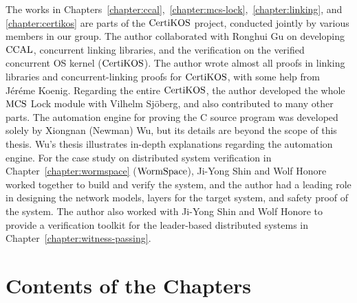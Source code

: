 The works in Chapters~\ref{chapter:ccal},~\ref{chapter:mcs-lock},~\ref{chapter:linking}, and \ref{chapter:certikos}  are parts of the $\mathrm{CertiKOS}$ project,
conducted jointly by various members in our group. 
The author collaborated with Ronghui Gu on developing  $\mathrm{CCAL}$, concurrent linking libraries, and the verification on the verified concurrent OS kernel ($\mathrm{CertiKOS}$). 
The author wrote almost all proofs in linking libraries and concurrent-linking proofs for $\mathrm{CertiKOS}$, with some help from J{\'e}r{\'e}me Koenig. 
Regarding the entire $\mathrm{CertiKOS}$, the author developed the whole $\mathrm{MCS}$ Lock module with Vilhelm Sj{\"o}berg, 
and also contributed to many other parts. 
The automation engine for proving the C source program was developed solely by Xiongnan (Newman) Wu, but its details are beyond the scope of this thesis. 
Wu’s thesis illustrates in-depth explanations regarding the automation engine. 
For the case study on distributed system verification in Chapter~\ref{chapter:wormspace} ($\mathrm{WormSpace}$), Ji-Yong Shin and Wolf Honore worked together to build and verify the system, 
and the author had a leading role in designing the network models, layers for the target system, and safety proof of the system. 
The author also worked with Ji-Yong Shin and Wolf Honore to provide a verification toolkit for the leader-based distributed systems in  Chapter~\ref{chapter:witness-passing}.


\section{Contents of the Chapters}
\label{chapter:introduction:sec:contents-of-the-chapters}

